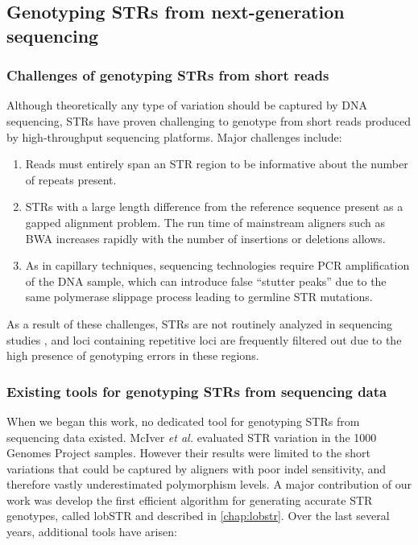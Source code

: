 \subsection{Genotyping STRs from next-generation sequencing}
\subsubsection{Challenges of genotyping STRs from short reads}
Although theoretically any type of variation should be captured by DNA sequencing, STRs have proven challenging to genotype from short reads produced by high-throughput sequencing platforms. Major challenges include:
\begin{enumerate}
\item Reads must entirely span an STR region to be informative about the number of repeats present.
\item STRs with a large length difference from the reference sequence present as a gapped alignment problem. The run time of mainstream aligners such as BWA \cite{LiDurbin2009a} increases rapidly  with the number of insertions or deletions allows.
\item As in capillary techniques, sequencing technologies require PCR amplification of the DNA sample, which can introduce false ``stutter peaks'' due to the same polymerase slippage process leading to germline STR mutations.
\end{enumerate}
As a result of these challenges, STRs are not routinely analyzed in sequencing studies \cite{TreangenSalzberg2012}, and loci containing repetitive loci are frequently filtered out due to the high presence of genotyping errors in these regions.

\subsubsection{Existing tools for genotyping STRs from sequencing data}
When we began this work, no dedicated tool for genotyping STRs from sequencing data existed. McIver \emph{et al.} \cite{McIverFondonSkinnerEtAl2011} evaluated STR variation in the 1000 Genomes Project \cite{AbecasisAltshulerAutonEtAl2010} samples. However their results were limited to the short variations that could be captured by aligners with poor indel sensitivity, and therefore vastly underestimated polymorphism levels. A major contribution of our work was develop the first efficient algorithm for generating accurate STR genotypes, called lobSTR \cite{GymrekGolanRossetEtAl2012} and described in \autoref{chap:lobstr}. Over the last several years, additional tools have arisen:

